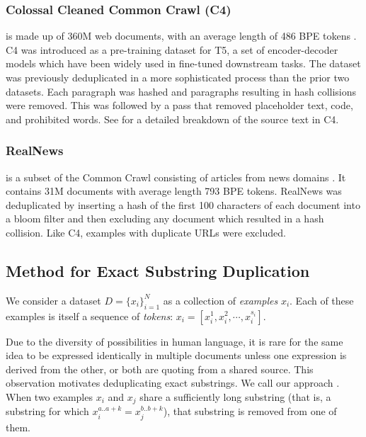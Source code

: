 \subsubsection{Colossal Cleaned Common Crawl (C4)}
is made up of 360M web documents, with an average length of 486 BPE tokens \citep{raffel2019exploring}.
C4 was introduced as a pre-training dataset for T5, a set of encoder-decoder models which have been widely used in fine-tuned downstream tasks.
The dataset was previously deduplicated in a more sophisticated process
than the prior two datasets.
Each paragraph was hashed and paragraphs resulting in hash collisions were removed.
This was followed by a pass that removed placeholder text, code, and prohibited words.
See \citet{dodge2021documenting} for a detailed breakdown of the source text in C4.


\subsubsection{RealNews}
is a subset of the Common Crawl consisting of articles from news domains \citep{zellers2019defending}.
It contains 31M documents with average length 793 BPE tokens.
RealNews was deduplicated by inserting a hash of the first 100 characters of each document into a bloom filter \citep{bloom1970space} and then excluding any document which resulted in a hash collision.
Like C4, examples with duplicate URLs were excluded.


\subsection{Method for Exact Substring Duplication} \label{sec:exact}
We consider a dataset $D = \{x_i\}_{i=1}^N$ as a collection of \emph{examples} $x_i$.
Each of these examples is itself a sequence of \emph{tokens}: $x_i = \left[ x_i^1, x_i^2, \cdots, x_i^{s_i} \right]$.

Due to the diversity of possibilities in human language, it is rare for the same idea to be expressed identically in multiple documents unless one expression is derived from the other, or both are quoting from a shared source.
This observation motivates deduplicating exact substrings. We call our approach \Exact{}.
When two examples $x_i$ and $x_j$ share a sufficiently long substring (that is, a substring for which $x_i^{a..a+k} = x_j^{b..b+k}$), that substring is removed from one of them.


